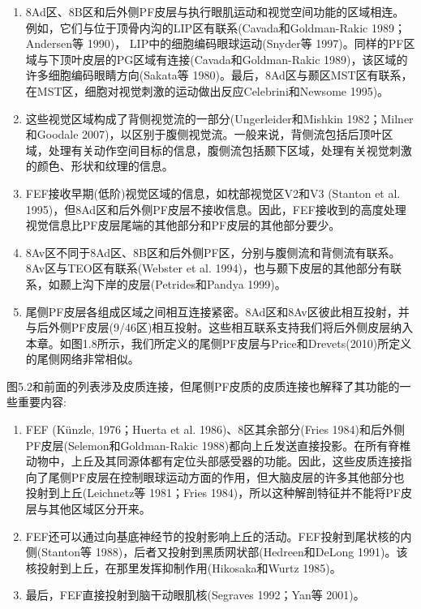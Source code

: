 \begin{enumerate}
	\item 8Ad区、8B区和后外侧PF皮层与执行眼肌运动和视觉空间功能的区域相连。例如，它们与位于顶骨内沟的LIP区有联系(Cavada和Goldman-Rakic 1989；Andersen等 1990)， LIP中的细胞编码眼球运动(Snyder等 1997)。同样的PF区域与下顶叶皮层的PG区域有连接(Cavada和Goldman-Rakic 1989)，该区域的许多细胞编码眼睛方向(Sakata等 1980)。最后，8Ad区与颞区MST区有联系，在MST区，细胞对视觉刺激的运动做出反应Celebrini和Newsome 1995)。
	\item 这些视觉区域构成了背侧视觉流的一部分(Ungerleider和Mishkin 1982；Milner和Goodale 2007)，以区别于腹侧视觉流。一般来说，背侧流包括后顶叶区域，处理有关动作空间目标的信息，腹侧流包括颞下区域，处理有关视觉刺激的颜色、形状和纹理的信息。
	\item FEF接收早期(低阶)视觉区域的信息，如枕部视觉区V2和V3 (Stanton et al. 1995)，但8Ad区和后外侧PF皮层不接收信息。因此，FEF接收到的高度处理视觉信息比PF皮层尾端的其他部分和PF皮层的其他部分要少。
	\item 8Av区不同于8Ad区、8B区和后外侧PF区，分别与腹侧流和背侧流有联系。8Av区与TEO区有联系(Webster et al. 1994)，也与颞下皮层的其他部分有联系，如颞上沟下岸的皮层(Petrides和Pandya 1999)。
	\item 尾侧PF皮层各组成区域之间相互连接紧密。8Ad区和8Av区彼此相互投射，并与后外侧PF皮层(9/46区)相互投射。这些相互联系支持我们将后外侧皮层纳入本章。如图1.8所示，我们所定义的尾侧PF皮层与Price和Drevets(2010)所定义的尾侧网络非常相似。
\end{enumerate}

图5.2和前面的列表涉及皮质连接，但尾侧PF皮质的皮质连接也解释了其功能的一些重要内容:

\begin{enumerate}
	\item FEF (Künzle, 1976；Huerta et al. 1986)、8区其余部分(Fries 1984)和后外侧PF皮层(Selemon和Goldman-Rakic 1988)都向上丘发送直接投影。在所有脊椎动物中，上丘及其同源体都有定位头部感受器的功能。因此，这些皮质连接指向了尾侧PF皮层在控制眼球运动方面的作用，但大脑皮层的许多其他部分也投射到上丘(Leichnetz等 1981；Fries 1984)，所以这种解剖特征并不能将PF皮层与其他区域区分开来。
	\item FEF还可以通过向基底神经节的投射影响上丘的活动。FEF投射到尾状核的内侧(Stanton等 1988)，后者又投射到黑质网状部(Hedreen和DeLong 1991)。该核投射到上丘，在那里发挥抑制作用(Hikosaka和Wurtz 1985)。
	\item 最后，FEF直接投射到脑干动眼肌核(Segraves 1992；Yan等 2001)。
\end{enumerate}

